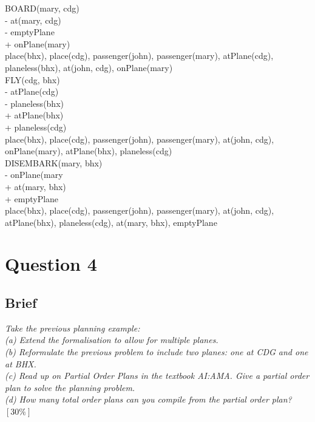 \documentclass{article}
\begin{document}
\newline
BOARD(mary, cdg) \\
\-\hspace{10mm} 	- at(mary, cdg) \\
\-\hspace{10mm} 	- emptyPlane \\
\-\hspace{10mm} 	+ onPlane(mary) \\
\newline
place(bhx),
place(cdg), passenger(john), passenger(mary), atPlane(cdg), \\
planeless(bhx), at(john, cdg), onPlane(mary)\\ 
\newline
FLY(cdg, bhx) \\
\-\hspace{10mm} 	- atPlane(cdg) \\
\-\hspace{10mm} 	- planeless(bhx) \\
\-\hspace{10mm} 	+ atPlane(bhx) \\
\-\hspace{10mm} 	+ planeless(cdg) \\
\newline
place(bhx),
place(cdg), passenger(john), passenger(mary), at(john, cdg), \\
onPlane(mary), atPlane(bhx), planeless(cdg) \\
\newline
DISEMBARK(mary, bhx) \\
\-\hspace{10mm} - onPlane(mary \\
\-\hspace{10mm} + at(mary, bhx) \\
\-\hspace{10mm} + emptyPlane \\
\newline
place(bhx),
place(cdg), passenger(john), passenger(mary), at(john, cdg), \\
atPlane(bhx), planeless(cdg), at(mary, bhx), emptyPlane \\
\newpage
\section{Question 4}
\subsection{Brief}
\textit{
Take the previous planning example: \\
\newline
(a) Extend the formalisation to allow for multiple planes. \\
(b) Reformulate the previous problem to include two planes: one at CDG and one at
BHX.\\
(c) Read up on Partial Order Plans in the textbook AI:AMA. Give a partial order plan
to solve the planning problem. \\
(d) How many total order plans can you compile from the partial order plan? $[30\%]$ \\}
\end{document}
